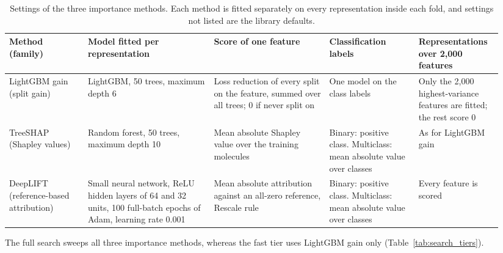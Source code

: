 \begin{table}[htbp]
\centering
\small
\begin{adjustbox}{max width=\textwidth,max totalheight=0.78\textheight}
\begin{tabular}{@{}P{0.15\linewidth}P{0.24\linewidth}P{0.22\linewidth}P{0.17\linewidth}P{0.16\linewidth}@{}}
\toprule
Method (family) & Model fitted per representation & Score of one feature & Classification labels & Representations over 2{,}000 features \\
\midrule
LightGBM gain (split gain) & LightGBM, 50 trees, maximum depth 6 & Loss reduction of every split on the feature, summed over all trees; 0 if never split on & One model on the class labels & Only the 2{,}000 highest-variance features are fitted; the rest score 0 \\
TreeSHAP (Shapley values) & Random forest, 50 trees, maximum depth 10 & Mean absolute Shapley value over the training molecules & Binary: positive class. Multiclass: mean absolute value over classes & As for LightGBM gain \\
DeepLIFT (reference-based attribution) & Small neural network, ReLU hidden layers of 64 and 32 units, 100 full-batch epochs of Adam, learning rate 0.001 & Mean absolute attribution against an all-zero reference, Rescale rule & Binary: positive class. Multiclass: mean absolute value over classes & Every feature is scored \\
\bottomrule
\end{tabular}
\end{adjustbox}
\caption[Settings of the three importance methods searched.]{Settings of the three importance methods. Each method is fitted separately on every representation inside each fold, and settings not listed are the library defaults.}
\label{tab:importance_methods}
\end{table}


The full search sweeps all three importance methods, whereas the fast tier uses LightGBM gain only (Table~\ref{tab:search_tiers}).



